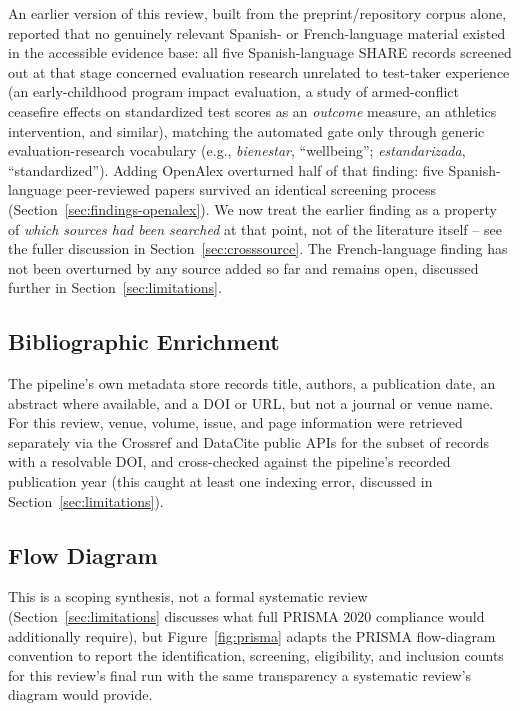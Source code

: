 \documentclass[11pt]{article}
\begin{document}
An earlier version of this review, built from the preprint/repository corpus alone, reported that no genuinely relevant Spanish- or French-language material existed in the accessible evidence base: all five Spanish-language SHARE records screened out at that stage concerned evaluation research unrelated to test-taker experience (an early-childhood program impact evaluation, a study of armed-conflict ceasefire effects on standardized test scores as an \emph{outcome} measure, an athletics intervention, and similar), matching the automated gate only through generic evaluation-research vocabulary (e.g., \textit{bienestar}, ``wellbeing''; \textit{estandarizada}, ``standardized''). Adding OpenAlex overturned half of that finding: five Spanish-language peer-reviewed papers survived an identical screening process (Section~\ref{sec:findings-openalex}). We now treat the earlier finding as a property of \emph{which sources had been searched} at that point, not of the literature itself -- see the fuller discussion in Section~\ref{sec:crosssource}. The French-language finding has not been overturned by any source added so far and remains open, discussed further in Section~\ref{sec:limitations}.

\subsection{Bibliographic Enrichment}

The pipeline's own metadata store records title, authors, a publication date, an abstract where available, and a DOI or URL, but not a journal or venue name. For this review, venue, volume, issue, and page information were retrieved separately via the Crossref and DataCite public APIs for the subset of records with a resolvable DOI, and cross-checked against the pipeline's recorded publication year (this caught at least one indexing error, discussed in Section~\ref{sec:limitations}).

\subsection{Flow Diagram}
\label{sec:prisma}

This is a scoping synthesis, not a formal systematic review (Section~\ref{sec:limitations} discusses what full PRISMA 2020 compliance would additionally require), but Figure~\ref{fig:prisma} adapts the PRISMA flow-diagram convention to report the identification, screening, eligibility, and inclusion counts for this review's final run with the same transparency a systematic review's diagram would provide.
\end{document}
